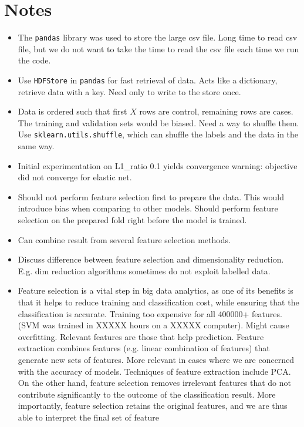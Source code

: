 \documentclass[12pt, twoside, a4paper]{report}
\begin{document}
\chapter{Notes}
\begin{itemize}
    \item The \texttt{pandas} library was used to store the large csv file. Long time to read csv file, but we do not want to take the time to read the csv file each time we run the code.
    
    \item Use \texttt{HDFStore} in \texttt{pandas} for fast retrieval of data. Acts like a dictionary, retrieve data with a key. Need only to write to the store once.
    
    \item Data is ordered such that first $X$ rows are control, remaining rows are cases. The training and validation sets would be biased. Need a way to shuffle them. Use \texttt{sklearn.utils.shuffle}, which can shuffle the labels and the data in the same way.
    
    \item Initial experimentation on L1\_ratio 0.1 yields convergence warning: objective did not converge for elastic net.
    
    \item Should not perform feature selection first to prepare the data. This would introduce bias when comparing to other models. Should perform feature selection on the prepared fold right before the model is trained.
    
    \item Can combine result from several feature selection methods.
    
    \item Discuss difference between feature selection and dimensionality reduction. E.g. dim reduction algorithms sometimes do not exploit labelled data.
    
    \item Feature selection is a vital step in big data analytics, as one of its benefits is that it helps to reduce training and classification cost, while ensuring that the classification is accurate.  Training too expensive for all 400000+ features. (SVM was trained in XXXXX hours on a XXXXX computer). Might cause overfitting. Relevant features are those that help prediction. Feature extraction combines features (e.g. linear combination of features) that generate new sets of features. More relevant in cases where we are concerned with the accuracy of models. Techniques of feature extraction include PCA. On the other hand, feature selection removes irrelevant features that do not contribute significantly to the outcome of the classification result. More importantly, feature selection retains the original features, and we are thus able to interpret the final set of feature \cite{RefWorks:163}
    

\end{itemize}
\end{document}
